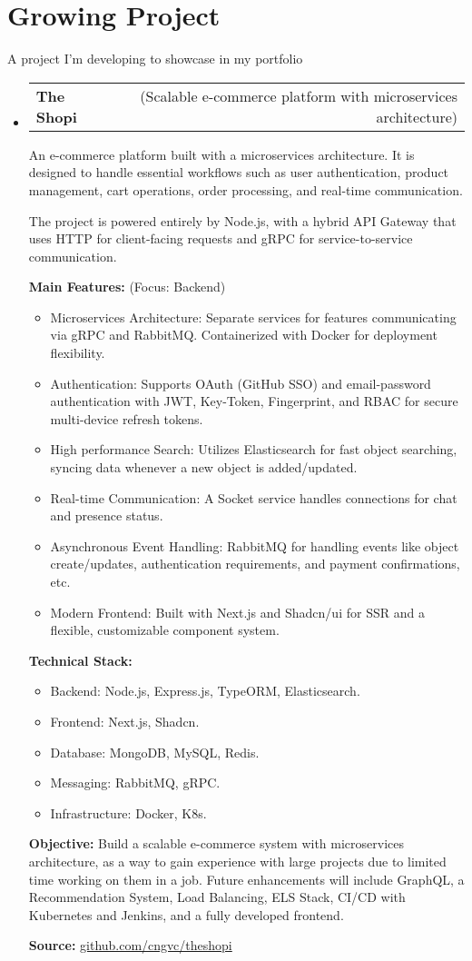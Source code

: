 \documentclass[letterpaper,11pt]{article}
\makeatletter
\newcommand{\resumeProjectTitle}[2]{
  \vspace{-2pt}\item
    \begin{tabular*}{1\textwidth}[t]{l @{\hskip 2pt} r}
      \textbf{#1} & \small #2 \\
    \end{tabular*}\vspace{2pt}
}
\newcommand{\resumeDesc}[1]{
  {#1\\ \vspace{2px}}
}
\newcommand{\resumeItem}[1]{
  \item{#1 \vspace{-2pt}}
}
\newcommand{\resumeItemListTitle}[1]{%
  \vspace{0pt} \textbf{#1} \vspace{-2pt}%
}
\newcommand{\resumeItemListStart}{\vspace{-4pt}\begin{itemize}[leftmargin=12px]}
\newcommand{\resumeItemListEnd}{\end{itemize}\vspace{-5pt}}
\newcommand{\resumeSubHeadingListStart}{\begin{itemize}[leftmargin=0pt, label={}]}
\newcommand{\resumeSubHeadingListEnd}{\end{itemize}\vspace{-8pt}}
\makeatother
\begin{document}
\section{Growing Project}
\resumeDesc{A project I’m developing to showcase in my portfolio}
\resumeSubHeadingListStart
\resumeProjectTitle{The Shopi}{(Scalable e-commerce platform with microservices architecture)}
\resumeDesc{An e-commerce platform built with a microservices architecture. It is designed to handle essential workflows such as user authentication, product management, cart operations, order processing, and real-time communication.}
\resumeDesc{The project is powered entirely by Node.js, with a hybrid API Gateway that uses HTTP for client-facing requests and gRPC for service-to-service communication.}
\resumeItemListTitle{Main Features:} (Focus: Backend)
\resumeItemListStart
    \resumeItem{Microservices Architecture: Separate services for features communicating via gRPC and RabbitMQ. Containerized with Docker for deployment flexibility.}
    \resumeItem{Authentication: Supports OAuth (GitHub SSO) and email-password authentication with JWT, Key-Token, Fingerprint, and RBAC for secure multi-device refresh tokens.}
    \resumeItem{High performance Search: Utilizes Elasticsearch for fast object searching, syncing data whenever a new object is added/updated.}
    \resumeItem{Real-time Communication: A Socket service handles connections for chat and presence status.}
    \resumeItem{Asynchronous Event Handling: RabbitMQ for handling events like object create/updates, authentication requirements, and payment confirmations, etc.}
    \resumeItem{Modern Frontend: Built with Next.js and Shadcn/ui for SSR and a flexible, customizable component system.}
\resumeItemListEnd
\resumeItemListTitle{Technical Stack:}
\resumeItemListStart
    \resumeItem{Backend: Node.js, Express.js, TypeORM, Elasticsearch.}
    \resumeItem{Frontend: Next.js, Shadcn.}
    \resumeItem{Database: MongoDB, MySQL, Redis.}
    \resumeItem{Messaging: RabbitMQ, gRPC.}
    \resumeItem{Infrastructure: Docker, K8s.}
\resumeItemListEnd
\resumeItemListTitle{Objective:} Build a scalable e-commerce system with microservices architecture, as a way to gain experience with large projects due to limited time working on them in a job. Future enhancements will include GraphQL, a Recommendation System, Load Balancing, ELS Stack, CI/CD with Kubernetes and Jenkins, and a fully developed frontend.
\par
\noindent\textbf{Source:} \url{github.com/cngvc/theshopi}
\resumeSubHeadingListEnd
\end{document}
